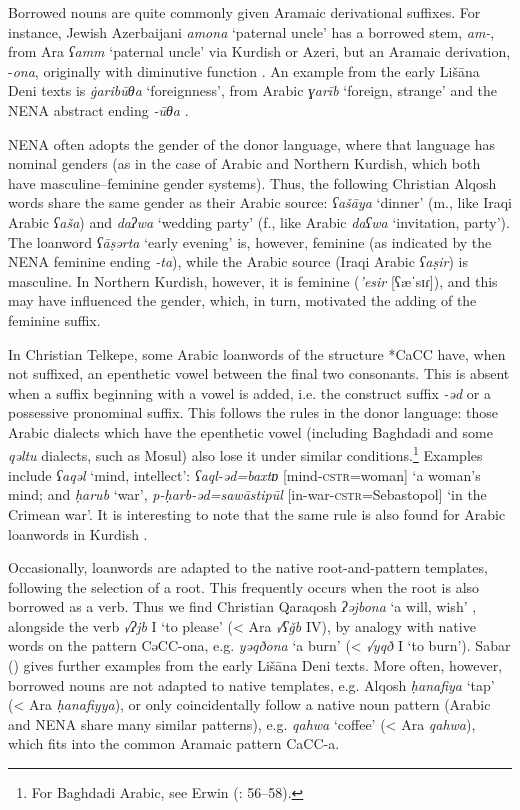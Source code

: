 \documentclass[output=paper]{langsci/langscibook}
\begin{document}
Borrowed nouns are quite commonly given Aramaic derivational suffixes. For instance, Jewish Azerbaijani \textit{amona} ‘paternal uncle’ has a borrowed stem, \textit{am-}, from Ara \textit{ʕamm} ‘paternal uncle’ via Kurdish or Azeri, but an Aramaic derivation, \nobreakdash-\textit{ona}, originally with diminutive function \citep[165]{Garbell1965}. An example from the early Lišāna Deni texts is \textit{\.garibūθa} ‘foreignness’, from Arabic \textit{ɣarīb} ‘foreign, strange’ and the NENA abstract ending \textit{{}-ūθa} \citep[205]{Sabar1984}.

NENA often adopts the gender of the donor language, where that language has nominal genders (as in the case of Arabic and Northern Kurdish, which both have masculine--feminine gender systems). Thus, the following Christian Alqosh words share the same gender as their Arabic source: \textit{ʕašāya} ‘dinner’ (m., like Iraqi Arabic \textit{ʕaša}) and \textit{daʔwa} ‘wedding party’ (f., like Arabic \textit{daʕwa} ‘invitation, party’). The loanword \textit{ʕāṣərta} ‘early evening’ is, however, feminine (as indicated by the NENA feminine ending \textit{{}-ta}), while the Arabic source (Iraqi Arabic \textit{ʕaṣir}) is masculine. In Northern Kurdish, however, it is feminine (\textit{{}'esir} [ʕæˈsɪɾ]), and this may have influenced the gender, which, in turn, motivated the adding of the feminine suffix.

In Christian Telkepe, some Arabic loanwords of the structure *CaCC have, when not suffixed, an epenthetic vowel between the final two consonants. This is absent when a suffix beginning with a vowel is added, i.e. the construct suffix \textit{{}-əd} or a possessive pronominal suffix. This follows the rules in the donor language: those Arabic dialects which have the epenthetic vowel (including Baghdadi and some \textit{qəltu} dialects, such as Mosul) also lose it under similar conditions.\footnote{For Baghdadi Arabic, see Erwin (\citeyear{Erwin1963}: 56–58).} Examples include \textit{ʕaqəl} ‘mind, intellect’: \textit{ʕaql-əd=baxtɒ} [mind-\textsc{cstr}=woman] ‘a woman’s mind; and \textit{ḥarub} ‘war’, \textit{p\nobreakdash-ḥarb\nobreakdash-əd=sawāstipūl} [in-war-\textsc{cstr}=Sebastopol] ‘in the Crimean war’. It is interesting to note that the same rule is also found for Arabic loanwords in Kurdish \citep[5]{Thackston2006}.

Occasionally, loanwords are adapted to the native root-and-pattern templates, following the selection of a root. This frequently occurs when the root is also borrowed as a verb. Thus we find Christian Qaraqosh \textit{ʔəjbona} ‘a will, wish’ \citep[517]{Khan2002}, alongside the verb \textit{√ʔjb} I ‘to please’ (< Ara \textit{√ʕǧb} IV), by analogy with native words on the pattern CəCC\nobreakdash-ona, e.g. \textit{yəqðona} ‘a burn’ (< \textit{√yqð} I ‘to burn’). Sabar (\citeyear[205]{Sabar1984}) gives further examples from the early Lišāna Deni texts. More often, however, borrowed nouns are not adapted to native templates, e.g. Alqosh \textit{ḥanafiya} ‘tap’ (< Ara \textit{ḥanafiyya}), or only coincidentally follow a native noun pattern (Arabic and NENA share many similar patterns), e.g. \textit{qahwa} ‘coffee’ (< Ara \textit{qahwa}), which fits into the common Aramaic pattern CaCC\nobreakdash-a.
\end{document}
